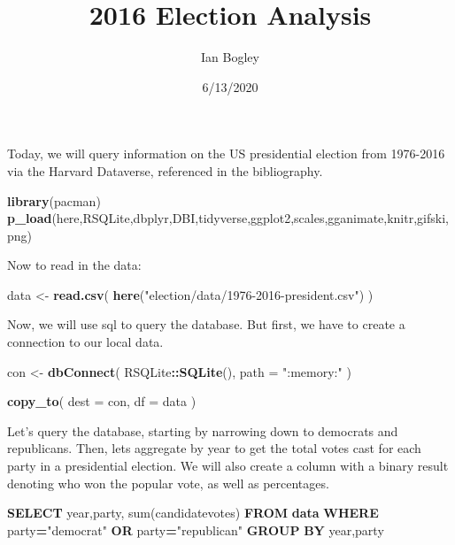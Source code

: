 \documentclass[
]{article}
\title{2016 Election Analysis}
\author{Ian Bogley}
\date{6/13/2020}
\newenvironment{Shaded}{\begin{snugshade}}{\end{snugshade}}
\newcommand{\DataTypeTok}[1]{\textcolor[rgb]{0.13,0.29,0.53}{#1}}
\newcommand{\FunctionTok}[1]{\textcolor[rgb]{0.00,0.00,0.00}{#1}}
\newcommand{\KeywordTok}[1]{\textcolor[rgb]{0.13,0.29,0.53}{\textbf{#1}}}
\newcommand{\NormalTok}[1]{#1}
\newcommand{\OperatorTok}[1]{\textcolor[rgb]{0.81,0.36,0.00}{\textbf{#1}}}
\newcommand{\OtherTok}[1]{\textcolor[rgb]{0.56,0.35,0.01}{#1}}
\newcommand{\StringTok}[1]{\textcolor[rgb]{0.31,0.60,0.02}{#1}}
\begin{document}
\maketitle

Today, we will query information on the US presidential election from
1976-2016 via the Harvard Dataverse, referenced in the bibliography.

\begin{Shaded}
\begin{Highlighting}[]
\KeywordTok{library}\NormalTok{(pacman)}
\KeywordTok{p_load}\NormalTok{(here,RSQLite,dbplyr,DBI,tidyverse,ggplot2,scales,gganimate,knitr,gifski,png)}
\end{Highlighting}
\end{Shaded}

Now to read in the data:

\begin{Shaded}
\begin{Highlighting}[]
\NormalTok{data <-}\StringTok{ }\KeywordTok{read.csv}\NormalTok{(}
  \KeywordTok{here}\NormalTok{(}\StringTok{"election/data/1976-2016-president.csv"}\NormalTok{)}
\NormalTok{  )}
\end{Highlighting}
\end{Shaded}

Now, we will use sql to query the database. But first, we have to create
a connection to our local data.

\begin{Shaded}
\begin{Highlighting}[]
\NormalTok{con <-}\StringTok{ }\KeywordTok{dbConnect}\NormalTok{(}
\NormalTok{  RSQLite}\OperatorTok{::}\KeywordTok{SQLite}\NormalTok{(), }
  \DataTypeTok{path =} \StringTok{":memory:"}
\NormalTok{  )}

\KeywordTok{copy_to}\NormalTok{(}
  \DataTypeTok{dest =}\NormalTok{ con, }
  \DataTypeTok{df =}\NormalTok{ data}
\NormalTok{  )}
\end{Highlighting}
\end{Shaded}

Let's query the database, starting by narrowing down to democrats and
republicans. Then, lets aggregate by year to get the total votes cast
for each party in a presidential election. We will also create a column
with a binary result denoting who won the popular vote, as well as
percentages.

\begin{Shaded}
\begin{Highlighting}[]
\KeywordTok{SELECT} \DataTypeTok{year}\NormalTok{,party, }\FunctionTok{sum}\NormalTok{(candidatevotes)}
\KeywordTok{FROM} \KeywordTok{data}
\KeywordTok{WHERE}\NormalTok{ party}\OperatorTok{=}\OtherTok{"democrat"} \KeywordTok{OR}\NormalTok{ party}\OperatorTok{=}\OtherTok{"republican"}
\KeywordTok{GROUP} \KeywordTok{BY} \DataTypeTok{year}\NormalTok{,party}
\end{Highlighting}
\end{Shaded}
\end{document}
